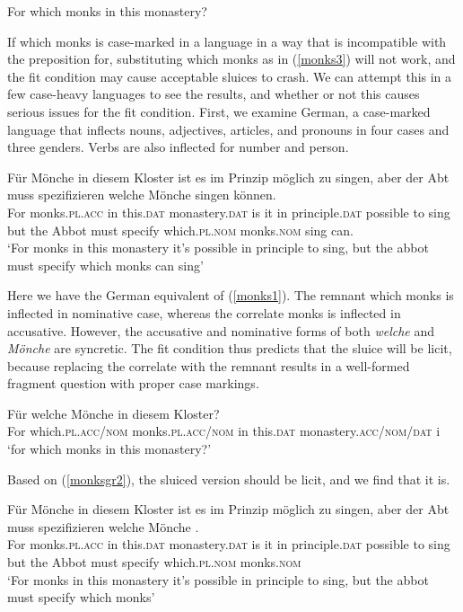\documentclass{turabian-researchpaper}
\begin{document}
\begin{exe}
\ex\label{monks3}
For which monks in this monastery? 
\end{exe}

If which monks is case-marked in a language in a way that is incompatible with the preposition for, substituting which monks as in (\ref{monks3}) will not work, and the fit condition may cause acceptable sluices to crash. We can attempt this in a few case-heavy languages to see the results, and whether or not this causes serious issues for the fit condition. First, we examine German, a case-marked language that inflects nouns, adjectives, articles, and pronouns in four cases and three genders. Verbs are also inflected for number and person. 

\begin{exe}
\ex\label{monksgr1}
\gll F\"ur M\"onche in diesem Kloster ist es im Prinzip m\"oglich  zu singen, aber der Abt muss spezifizieren welche M\"onche singen k\"onnen. \\
For monks.\textsc{pl.acc} in this.\textsc{dat} monastery.\textsc{dat} is it in principle.\textsc{dat} possible to  sing but the Abbot must  specify which.\textsc{pl.nom} monks.\textsc{nom} sing can. \\
\trans `For monks in this monastery it's possible in principle to sing, but the abbot must specify 
which monks can sing'
\end{exe}

Here we have the German equivalent of (\ref{monks1}). The remnant which monks is inflected in nominative case, whereas the correlate monks is inflected in accusative. However, the accusative and nominative forms of both \textit{welche} and \textit{M\"onche} are syncretic. The fit condition thus predicts that the sluice will be licit, because replacing the correlate with the remnant results in a well-formed fragment question with proper case markings. 

\begin{exe}
\ex\label{monksgr2}
\gll F\"ur welche M\"onche in diesem Kloster? \\
For which.\textsc{pl.acc/nom} monks.\textsc{pl.acc/nom} in this.\textsc{dat} monastery.\textsc{acc/nom/dat} i\\
\trans `for which monks in this monastery?'
\end{exe}

Based on (\ref{monksgr2}), the sluiced version should be licit, and we find that it is. 

\begin{exe}
\ex\label{monksgr3}
\gll F\"ur M\"onche in diesem Kloster ist es im Prinzip m\"oglich  zu singen, aber der Abt muss spezifizieren welche M\"onche . \\
For monks.\textsc{pl.acc} in this.\textsc{dat} monastery.\textsc{dat} is it in principle.\textsc{dat} possible to  sing but the Abbot must  specify which.\textsc{pl.nom} monks.\textsc{nom} \\
\trans `For monks in this monastery it's possible in principle to sing, but the abbot must specify 
which monks'
\end{exe}
\end{document}
